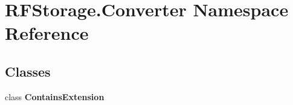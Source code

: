 \section{R\+F\+Storage.\+Converter Namespace Reference}
\label{namespace_r_f_storage_1_1_converter}
\subsection*{Classes}
\begin{DoxyCompactItemize}
\item 
class {\bfseries Contains\+Extension}
\end{DoxyCompactItemize}

